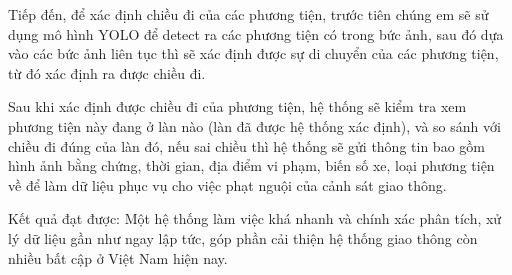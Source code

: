 \documentclass[12pt,twoside,a4paper]{article}
\begin{document}
\par
Tiếp đến, để xác định chiều đi của các phương tiện, trước tiên chúng em sẽ sử dụng mô hình YOLO để detect ra các phương tiện có trong bức ảnh, sau đó dựa vào các bức ảnh liên tục thì sẽ xác định được sự di chuyển của các phương tiện, từ đó xác định ra được chiều đi.
\par
Sau khi xác định được chiều đi của phương tiện, hệ thống sẽ kiểm tra xem phương tiện này đang ở làn nào (làn đã được hệ thống xác định), và so sánh với chiều đi đúng của làn đó, nếu sai chiều thì hệ thống sẽ gửi thông tin bao gồm hình ảnh bằng chứng, thời gian, địa điểm vi phạm, biến số xe, loại phương tiện về để làm dữ liệu phục vụ cho việc phạt nguội của cảnh sát giao thông.
\par
Kết quả đạt được: Một hệ thống làm việc khá nhanh và chính xác phân tích, xử lý dữ liệu gần như ngay lập tức, góp phần cải thiện hệ thống giao thông còn nhiều bất cập ở Việt Nam hiện nay.
\end{document}
